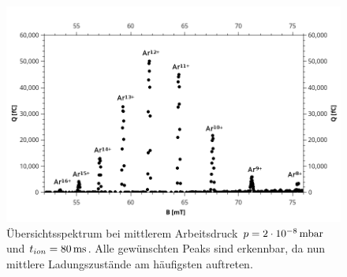 		\begin{figure}
							\centering
							\includegraphics[width=\linewidth]{pic/2e-8_beschriftet}
							\caption{Übersichtsspektrum bei mittlerem Arbeitsdruck $p = \unit[2\cdot 10^{-8}]{mbar}$ und $t_{ion} = \unit[80]{ms}$. Alle gewünschten Peaks sind erkennbar, da nun mittlere Ladungszustände am häufigsten auftreten.}
							\label{fig:2e-8}
		\end{figure}
		